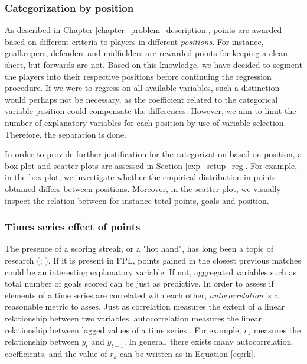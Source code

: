 \subsubsection{Categorization by position}


As described in Chapter \ref{chapter_problem_description}, points are awarded based on different criteria to players in different \textit{positions}. For instance, goalkeepers, defenders and midfielders are rewarded points for keeping a clean sheet, but forwards are not. Based on this knowledge, we have decided to segment the players into their respective positions before continuing the regression procedure. If we were to regress on all available variables, such a distinction would perhaps not be necessary, as the coefficient related to the categorical variable position could compensate the differences. However, we aim to limit the number of explanatory variables for each position by use of variable selection. Therefore, the separation is done. 

\newpar

In order to provide further justification for the categorization based on position, a box-plot and scatter-plots are assessed in Section \ref{exp_setup_reg}. For example, in the box-plot, we investigate whether the empirical distribution in points obtained differs between positions. Moreover, in the scatter plot, we visually inspect the relation between for instance total points, goals and position.

\subsubsection{Times series effect of points}

The presence of a scoring streak, or a "hot hand", has long been a topic of research (\cite{hot_hand}; \cite{hot_hand_2}). If it is present in FPL, points gained in the closest previous matches could be an interesting explanatory variable. If not, aggregated variables such as total number of goals scored can be just as predictive. In order to assess if elements of a time series are correlated with each other, \textit{autocorrelation} is a reasonable metric to asses. Just as correlation measures the extent of a linear relationship between two variables, autocorrelation measures the linear relationship between lagged values of a time series \citep{Hyndman}. For example, $r_1$ measures the relationship between $y_t$ and $y_{t-1}$. In general, there exists many autocorrelation coefficients, and the value of $r_k$ can be written as in Equation \ref{eq:rk}. 


